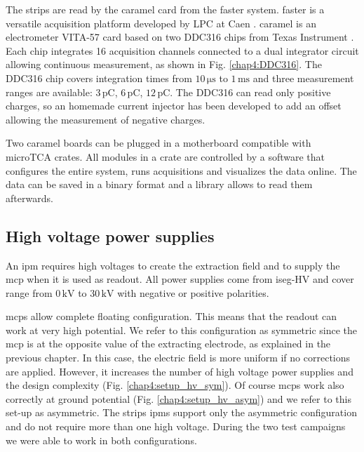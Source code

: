 \begin{refsection}
  The strips are read by the \acrshort{caramel} card \cite{caramel2013} from the \acrshort{faster} system. \acrshort{faster} is a versatile acquisition platform developed by LPC at Caen \cite{faster2013}. \acrshort{caramel} is an electrometer VITA-57 card based on two DDC316 chips from Texas Instrument \cite{ddc316}. Each chip integrates 16 acquisition channels connected to a dual integrator circuit allowing continuous measurement, as shown in Fig. \ref{chap4:DDC316}. The DDC316 chip covers integration times from $10\,\mathrm{\mu s}$ to $1\,\mathrm{ms}$ and three measurement ranges are available: $3\,\mathrm{pC}$, $6\,\mathrm{pC}$, $12\,\mathrm{pC}$. The DDC316 can read only positive charges, so an homemade current injector has been developed to add an offset allowing the measurement of negative charges.
  

  Two \acrshort{caramel} boards can be plugged in a motherboard compatible with microTCA crates. All modules in a crate are controlled by a software that configures the entire system, runs acquisitions and visualizes \cite{rhb2012} the data online. The data can be saved in a binary format and a library allows to read them afterwards.

  \subsection{High voltage power supplies}
  An \acrshort{ipm} requires high voltages to create the extraction field and to supply the \acrshort{mcp} when it is used as readout. All power supplies come from iseg-HV \cite{iseg2019} and cover range from $0\,\mathrm{kV}$ to $30\,\mathrm{kV}$ with negative or positive polarities.

  \acrshort{mcp}s allow complete floating configuration. This means that the readout can work at very high potential. We refer to this configuration as symmetric since the \acrshort{mcp} is at the opposite value of the extracting electrode, as explained in the previous chapter. In this case, the electric field is more uniform if no corrections are applied. However, it increases the number of high voltage power supplies and the design complexity (Fig. \ref{chap4:setup_hv_sym}).
  Of course \acrshort{mcp}s work also correctly at ground potential (Fig. \ref{chap4:setup_hv_asym}) and we refer to this set-up as asymmetric. The strips \acrshort{ipm}s support only the asymmetric configuration and do not require more than one high voltage. During the two test campaigns we were able to work in both configurations.


\end{refsection}

